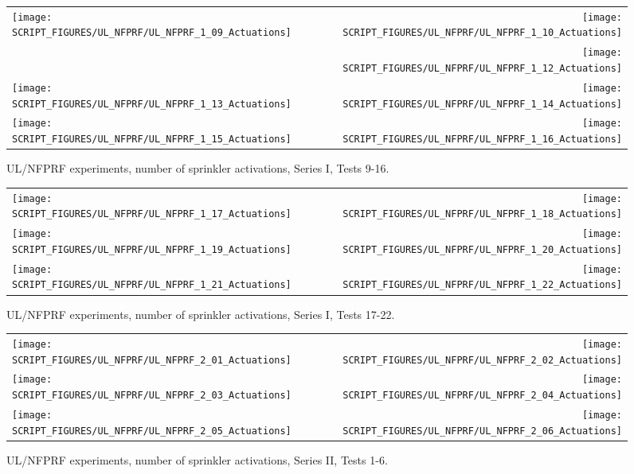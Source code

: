 \begin{figure}[p]
\begin{tabular*}{\textwidth}{l@{\extracolsep{\fill}}r}
\texttt{[image: SCRIPT\_FIGURES/UL\_NFPRF/UL\_NFPRF\_1\_09\_Actuations]} &
\texttt{[image: SCRIPT\_FIGURES/UL\_NFPRF/UL\_NFPRF\_1\_10\_Actuations]} \\
&
\texttt{[image: SCRIPT\_FIGURES/UL\_NFPRF/UL\_NFPRF\_1\_12\_Actuations]} \\
\texttt{[image: SCRIPT\_FIGURES/UL\_NFPRF/UL\_NFPRF\_1\_13\_Actuations]} &
\texttt{[image: SCRIPT\_FIGURES/UL\_NFPRF/UL\_NFPRF\_1\_14\_Actuations]} \\
\texttt{[image: SCRIPT\_FIGURES/UL\_NFPRF/UL\_NFPRF\_1\_15\_Actuations]} &
\texttt{[image: SCRIPT\_FIGURES/UL\_NFPRF/UL\_NFPRF\_1\_16\_Actuations]} \\
\end{tabular*}
\caption{UL/NFPRF experiments, number of sprinkler activations, Series I, Tests 9-16.}
\label{UL_NFPRF_2}
\end{figure}

\begin{figure}[p]
\begin{tabular*}{\textwidth}{l@{\extracolsep{\fill}}r}
\texttt{[image: SCRIPT\_FIGURES/UL\_NFPRF/UL\_NFPRF\_1\_17\_Actuations]} &
\texttt{[image: SCRIPT\_FIGURES/UL\_NFPRF/UL\_NFPRF\_1\_18\_Actuations]} \\
\texttt{[image: SCRIPT\_FIGURES/UL\_NFPRF/UL\_NFPRF\_1\_19\_Actuations]} &
\texttt{[image: SCRIPT\_FIGURES/UL\_NFPRF/UL\_NFPRF\_1\_20\_Actuations]} \\
\texttt{[image: SCRIPT\_FIGURES/UL\_NFPRF/UL\_NFPRF\_1\_21\_Actuations]} &
\texttt{[image: SCRIPT\_FIGURES/UL\_NFPRF/UL\_NFPRF\_1\_22\_Actuations]}
\end{tabular*}
\caption{UL/NFPRF experiments, number of sprinkler activations, Series I, Tests 17-22.}
\label{UL_NFPRF_3}
\end{figure}

\begin{figure}[p]
\begin{tabular*}{\textwidth}{l@{\extracolsep{\fill}}r}
\texttt{[image: SCRIPT\_FIGURES/UL\_NFPRF/UL\_NFPRF\_2\_01\_Actuations]} &
\texttt{[image: SCRIPT\_FIGURES/UL\_NFPRF/UL\_NFPRF\_2\_02\_Actuations]} \\
\texttt{[image: SCRIPT\_FIGURES/UL\_NFPRF/UL\_NFPRF\_2\_03\_Actuations]} &
\texttt{[image: SCRIPT\_FIGURES/UL\_NFPRF/UL\_NFPRF\_2\_04\_Actuations]} \\
\texttt{[image: SCRIPT\_FIGURES/UL\_NFPRF/UL\_NFPRF\_2\_05\_Actuations]} &
\texttt{[image: SCRIPT\_FIGURES/UL\_NFPRF/UL\_NFPRF\_2\_06\_Actuations]}
\end{tabular*}
\caption{UL/NFPRF experiments, number of sprinkler activations, Series II, Tests 1-6.}
\label{UL_NFPRF_2_1}
\end{figure}

